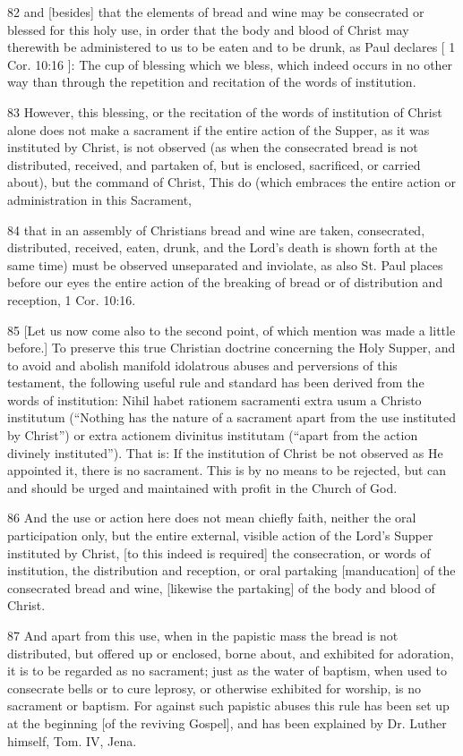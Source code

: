 82 and [besides] that the elements of bread and wine may be consecrated or blessed for this holy use, in order that the body and blood of Christ may therewith be administered to us to be eaten and to be drunk, as Paul declares [ 1 Cor. 10:16 ]: The cup of blessing which we bless, which indeed occurs in no other way than through the repetition and recitation of the words of institution.

83 However, this blessing, or the recitation of the words of institution of Christ alone does not make a sacrament if the entire action of the Supper, as it was instituted by Christ, is not observed (as when the consecrated bread is not distributed, received, and partaken of, but is enclosed, sacrificed, or carried about), but the command of Christ, This do (which embraces the entire action or administration in this Sacrament,

84 that in an assembly of Christians bread and wine are taken, consecrated, distributed, received, eaten, drunk, and the Lord’s death is shown forth at the same time) must be observed unseparated and inviolate, as also St. Paul places before our eyes the entire action of the breaking of bread or of distribution and reception, 1 Cor. 10:16.

85 [Let us now come also to the second point, of which mention was made a little before.] To preserve this true Christian doctrine concerning the Holy Supper, and to avoid and abolish manifold idolatrous abuses and perversions of this testament, the following useful rule and standard has been derived from the words of institution: Nihil habet rationem sacramenti extra usum a Christo institutum (“Nothing has the nature of a sacrament apart from the use instituted by Christ”) or extra actionem divinitus institutam (“apart from the action divinely instituted”). That is: If the institution of Christ be not observed as He appointed it, there is no sacrament. This is by no means to be rejected, but can and should be urged and maintained with profit in the Church of God.

86 And the use or action here does not mean chiefly faith, neither the oral participation only, but the entire external, visible action of the Lord’s Supper instituted by Christ, [to this indeed is required] the consecration, or words of institution, the distribution and reception, or oral partaking [manducation] of the consecrated bread and wine, [likewise the partaking] of the body and blood of Christ.

87 And apart from this use, when in the papistic mass the bread is not distributed, but offered up or enclosed, borne about, and exhibited for adoration, it is to be regarded as no sacrament; just as the water of baptism, when used to consecrate bells or to cure leprosy, or otherwise exhibited for worship, is no sacrament or baptism. For against such papistic abuses this rule has been set up at the beginning [of the reviving Gospel], and has been explained by Dr. Luther himself, Tom. IV, Jena.

